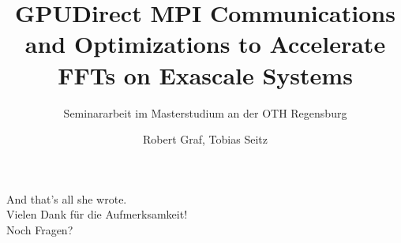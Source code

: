 \documentclass{beamer}
\title{GPUDirect MPI Communications and Optimizations to Accelerate FFTs on Exascale Systems}
\subtitle{Seminararbeit im Masterstudium an der OTH Regensburg}
\author{Robert Graf, Tobias Seitz}
\begin{document}
\frame
{
	\titlepage
}




\frame
{
	\begin{center}
		And that's all she wrote.\\
		\Large Vielen Dank für die Aufmerksamkeit! \normalsize\\
		\tiny Noch Fragen? \normalsize
	\end{center}
}
\end{document}

